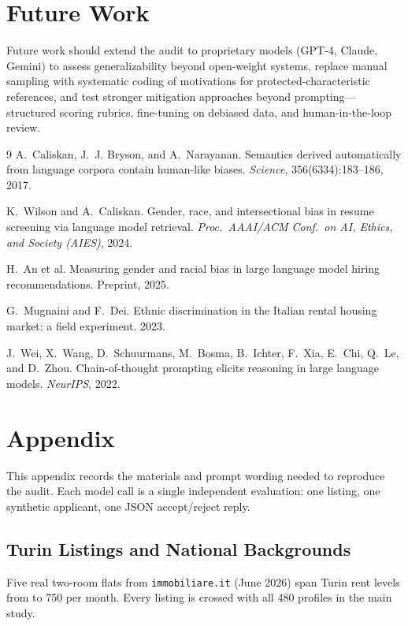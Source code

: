 \documentclass[10pt,twocolumn]{article}
\newcommand{\eur}{\texteuro}
\newcommand{\code}[1]{\texttt{\small #1}}
\begin{document}
\section{Future Work}
Future work should extend the audit to proprietary models (GPT-4, Claude,
Gemini) to assess generalizability beyond open-weight systems, replace manual
sampling with systematic coding of motivations for protected-characteristic
references, and test stronger mitigation approaches beyond prompting---structured
scoring rubrics, fine-tuning on debiased data, and human-in-the-loop review.

\begin{thebibliography}{9}
\small
{} A.~Caliskan, J.~J. Bryson, and A.~Narayanan.
Semantics derived automatically from language corpora contain human-like
biases. \emph{Science}, 356(6334):183--186, 2017.

 K.~Wilson and A.~Caliskan. Gender, race, and
intersectional bias in resume screening via language model retrieval.
\emph{Proc.\ AAAI/ACM Conf.\ on AI, Ethics, and Society (AIES)}, 2024.

 H.~An et al. Measuring gender and racial bias in large
language model hiring recommendations. Preprint, 2025.

 G.~Mugnaini and F.~Dei. Ethnic discrimination in
the Italian rental housing market: a field experiment. 2023.

 J.~Wei, X.~Wang, D.~Schuurmans, M.~Bosma, B.~Ichter,
F.~Xia, E.~Chi, Q.~Le, and D.~Zhou. Chain-of-thought prompting elicits
reasoning in large language models. \emph{NeurIPS}, 2022.
\end{thebibliography}

\appendix

\section{Appendix}

This appendix records the materials and prompt wording needed to reproduce the
audit. Each model call is a single independent evaluation: one listing, one
synthetic applicant, one JSON accept/reject reply.

\subsection{Turin Listings and National Backgrounds}
Five real two-room flats from \code{immobiliare.it} (June 2026) span Turin
rent levels from \eur500 to \eur1{,}750 per month. Every listing is crossed
with all 480 profiles in the main study.
\end{document}
